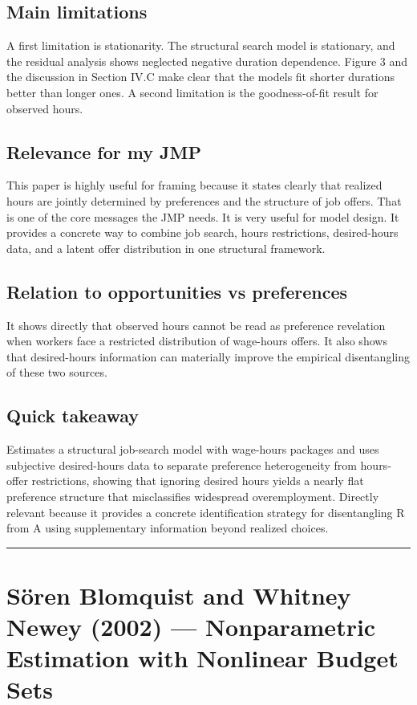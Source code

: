 \documentclass[11pt,a4paper]{article}
\begin{document}
\subsection*{Main limitations}
A first limitation is stationarity. The structural search model is stationary, and the residual analysis shows neglected negative duration dependence. Figure 3 and the discussion in Section IV.C make clear that the models fit shorter durations better than longer ones. A second limitation is the goodness-of-fit result for observed hours.

\subsection*{Relevance for my JMP}
This paper is highly useful for framing because it states clearly that realized hours are jointly determined by preferences and the structure of job offers. That is one of the core messages the JMP needs. It is very useful for model design. It provides a concrete way to combine job search, hours restrictions, desired-hours data, and a latent offer distribution in one structural framework.

\subsection*{Relation to opportunities vs preferences}
It shows directly that observed hours cannot be read as preference revelation when workers face a restricted distribution of wage-hours offers. It also shows that desired-hours information can materially improve the empirical disentangling of these two sources.

\subsection*{Quick takeaway}
Estimates a structural job-search model with wage-hours packages and uses subjective desired-hours data to separate preference heterogeneity from hours-offer restrictions, showing that ignoring desired hours yields a nearly flat preference structure that misclassifies widespread overemployment. Directly relevant because it provides a concrete identification strategy for disentangling R from A using supplementary information beyond realized choices.


\medskip\hrule\medskip

\section*{Sören Blomquist and Whitney Newey (2002) — Nonparametric Estimation with Nonlinear Budget Sets}
\end{document}
